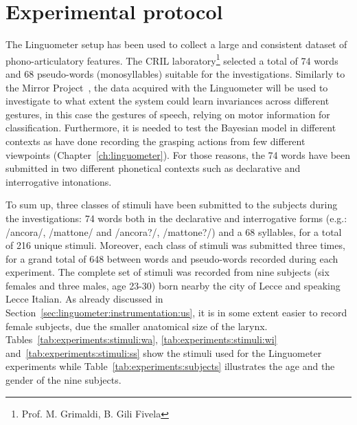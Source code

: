 \section{Experimental protocol}
\label{sec:experiments:protocol}
The Linguometer setup has been used to collect a large and consistent dataset
of phono-articulatory features.
The CRIL laboratory\footnote{Prof. M. Grimaldi, B. Gili Fivela} selected a
total of 74 words and 68 pseudo-words (monosyllables) suitable for the 
investigations.
Similarly to the Mirror Project~\citep{metta.etal:2006}, the data acquired
with the Linguometer will be
used to investigate to what extent the system could learn invariances across 
different gestures, in this case the gestures of speech, relying on motor 
information for classification.
Furthermore, it is needed to test the Bayesian model in different contexts as 
\citet{metta.etal:2006} have done recording the grasping actions from few
different viewpoints (Chapter~\ref{ch:linguometer}).
For those reasons, the 74 words have been submitted in two different
phonetical contexts such as declarative and interrogative intonations.



To sum up, three classes of stimuli have been submitted to the subjects 
during the investigations: 74 words both in the declarative and interrogative 
forms (e.g.: /ancora/, /mattone/ and /ancora?/, /mattone?/) and a 68 syllables, 
for a total of 216 unique stimuli.
Moreover, each class of stimuli was submitted three times, for a grand total 
of 648 between words and pseudo-words recorded during each experiment.
The complete set of stimuli was recorded from nine subjects (six females and
three males, age 23-30) born nearby the city of Lecce and speaking Lecce
Italian.
As already discussed in Section~\ref{sec:linguometer:instrumentation:us}, it is in
some extent easier to record female subjects, due the smaller anatomical size of
the larynx.
Tables~\ref{tab:experiments:stimuli:wa}, \ref{tab:experiments:stimuli:wi} 
and~\ref{tab:experiments:stimuli:ss} show the stimuli used for the
Linguometer experiments while Table~\ref{tab:experiments:subjects} illustrates 
the age and the gender of the nine subjects.


